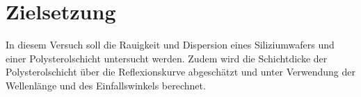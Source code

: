 \section{Zielsetzung}
\label{sec:Zielsetzung}
In diesem Versuch soll die Rauigkeit und Dispersion eines Siliziumwafers und einer Polysterolschicht untersucht werden.
Zudem wird die Schichtdicke der Polysterolschicht über die Reflexionskurve abgeschätzt und unter Verwendung der Wellenlänge und des Einfallswinkels berechnet.